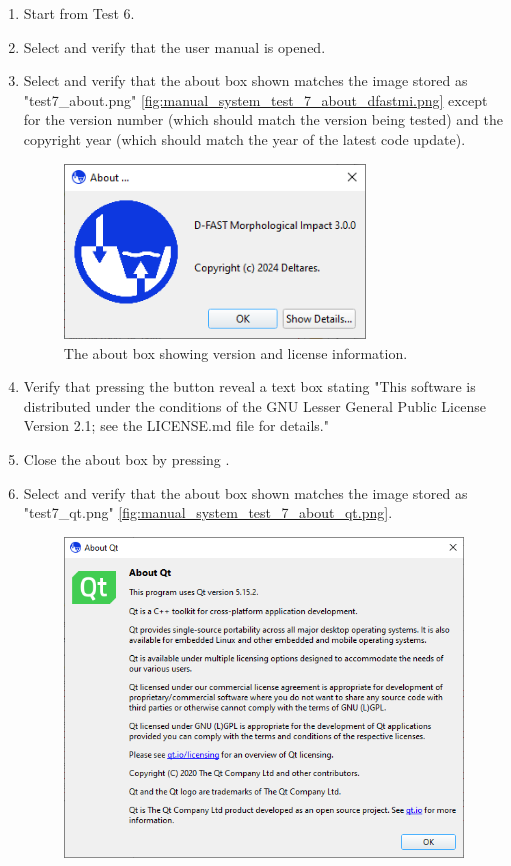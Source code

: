 \begin{enumerate}
\item Start from Test 6.
\item Select  \textrightarrow {} and verify that the user manual is opened.
\item Select  \textrightarrow {} and verify that the about box shown matches the image stored as "test7\_about.png" \autoref{fig:manual_system_test_7_about_dfastmi.png} except for the version number (which should match the version being tested) and the copyright year (which should match the year of the latest code update).
\begin{figure}[H]
	\center
	\includegraphics[width=8cm]{figures/manual_system_test_7_about_dfastmi.png}
	\caption{The \dfmi about box showing version and license information.}
	\label{fig:manual_system_test_7_about_dfastmi.png}
\end{figure}
\item Verify that pressing the  button reveal a text box stating "This software is distributed under the conditions of the GNU Lesser General Public License Version 2.1; see the LICENSE.md file for details."
\item Close the about box by pressing .
\item Select  \textrightarrow {} and verify that the about box shown matches the image stored as "test7\_qt.png" \autoref{fig:manual_system_test_7_about_qt.png}.
\begin{figure}[H]
	\center
	\includegraphics[width=12cm]{figures/manual_system_test_7_about_qt.png}

\end{figure}
\end{enumerate}
